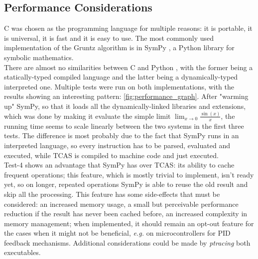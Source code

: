 \documentclass{article}
\theoremstyle{plain}
\theoremstyle{definition}
\theoremstyle{algorithm}
\begin{document}
	
	\subsection{Performance Considerations}
	
	C was chosen as the programming language for multiple reasons: it is portable, it is universal, it is fast and it is easy to use.
	The most commonly used implementation of the Gruntz algorithm is in SymPy \cite{10.7717/peerj-cs.103}, a Python library for symbolic mathematics. \\
	There are almost no similarities between C and Python \cite{book:python}, with the former being a statically-typed \cite{wiki:typesystem} compiled language and the latter being a dynamically-typed \cite{wiki:typesystem} interpreted one. 
	Multiple tests were run on both implementations, with the results showing an interesting pattern: \cref{fig:performance_graph}. After "warming up" SymPy, so that it loads all the dynamically-linked libraries and extensions, which was done by making it evaluate the simple limit \(\lim_{x \to 0}{\frac{\sin(x)}{x}}\), the running time seems to scale linearly between the two systems in the first three tests. The difference is most probably due to the fact that SymPy runs in an interpreted language, so every instruction has to be parsed, evaluated and executed, while TCAS is compiled to machine code and just executed. \\
	Test-4 shows an advantage that SymPy has over TCAS: its ability to cache frequent operations; this feature, which is mostly trivial to implement, isn't ready yet, so on longer, repeated operations SymPy is able to reuse the old result and skip all the processing. This feature has some side-effects that must be considered: an increased memory usage, a small but perceivable performance reduction if the result has never been cached before, an increased complexity in memory management; when implemented, it should remain an opt-out feature for the cases when it might not be beneficial, \textit{e.g.} on microcontrollers for PID \cite{wiki:pid} feedback mechanisms.
	Additional considerations could be made by \textit{ptracing} \cite{wiki:ptrace} both executables.
	
	
	\newpage
	\nocite{book:kr}
	\nocite{pdf:gnump}
	\nocite{pdf:mpfr}
	\printbibliography
	
\end{document}
